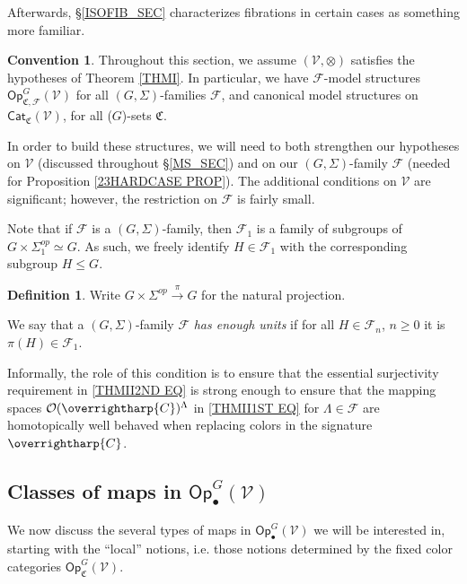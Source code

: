 \documentclass[a4paper,10pt
,draft
]{article}%
\numberwithin{equation}{section}
\numberwithin{figure}{section}
\theoremstyle{definition} %
\newtheorem{definition}[equation]{Definition}%
\newtheorem{convention}[equation]{Convention}%
\newcommand{\vect}[1]{\text{\overrightharp{\ensuremath{#1}}}}
\newcommand{\Cat}{\mathsf{Cat}}
\newcommand{\Op}{\mathsf{Op}}%
\newcommand{\F}{\ensuremath{\mathcal F}}
\newcommand{\V}{\ensuremath{\mathcal V}}
\renewcommand{\O}{\ensuremath{\mathcal O}}
\newcommand{\1}{\ensuremath{\mathbbm 1}}%
\begin{document}
Afterwards, \S \ref{ISOFIB_SEC} characterizes fibrations in certain cases as something more familiar. 



\begin{convention}
      Throughout this section, we assume $(\V, \otimes)$ satisfies the hypotheses of Theorem \ref{THMI}.
      In particular, we have $\F$-model structures $\Op^G_{\mathfrak C, \F}(\V)$ for all $(G,\Sigma)$-families $\F$,
      and canonical model structures on $\Cat_{\mathfrak C}(\V)$,
      for all ($G$)-sets $\mathfrak C$.
\end{convention}

In order to build these structures, we will need to both strengthen our hypotheses on $\V$ (discussed throughout \S \ref{MS_SEC})
and on our $(G,\Sigma)$-family $\F$ (needed for Proposition \ref{23HARDCASE PROP}).
The additional conditions on $\V$ are significant;
however, the restriction on $\F$ is fairly small.




Note that if $\mathcal{F}$ is a 
$(G,\Sigma)$-family, then 
$\mathcal{F_1}$ is a family of subgroups of 
$G \times \Sigma_1^{op} \simeq G$.
As such, we freely identify 
$H \in \F_1$ with the corresponding subgroup $H\leq G$.

\begin{definition}\label{FAMRESUNI DEF}
Write $G \times \Sigma^{op} \xrightarrow{\pi} 
G$
for the natural projection.

We say that a $(G,\Sigma)$-family $\F$ 
\emph{has enough units}
if for all $H \in \F_n$, $n\geq 0$
it is $\pi(H) \in \F_1$.
\end{definition}


Informally, the role of this condition 
is to ensure that the essential surjectivity requirement in 
\eqref{THMII2ND EQ} is strong enough
to ensure that the mapping spaces
$\O(\vect{C})^{\Lambda}$ in \eqref{THMII1ST EQ}
for $\Lambda \in \F$
are homotopically well behaved when replacing colors 
in the signature $\vect{C}$. 





\subsection{Classes of maps in $\mathsf{Op}^G_\bullet(\V)$}
\label{MAPSOPG_SEC}


We now discuss the several types of maps in 
$\mathsf{Op}^G_\bullet(\V)$ we will be interested in,
starting with the ``local'' notions, 
i.e. those notions determined by the fixed color categories $\mathsf{Op}_{\mathfrak{C}}^G(\V)$.
\end{document}
